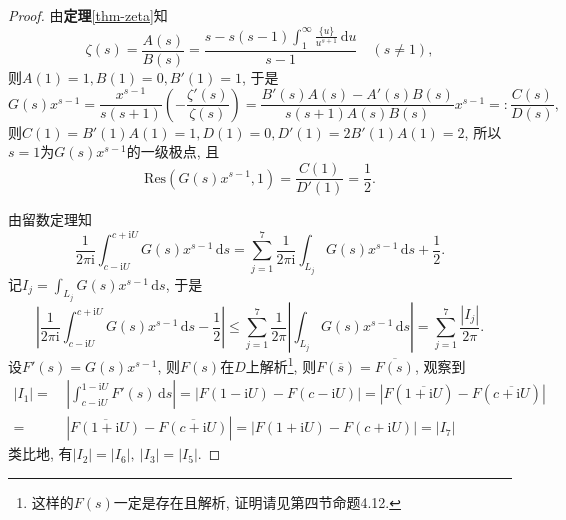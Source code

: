 \documentclass[12pt, a4paper, oneside]{ctexart}
\numberwithin{equation}{section}  %
\let\leq=\leqslant %
\def\disp{\displaystyle}    %
\def\d{\mathrm{d}}          %
\def\i{\mathrm{i}}          %
\def\res{\mathrm{Res}}      %
\def\ol{\overline}          %
\begin{document}
\begin{proof}
    由\textbf{定理}\ref{thm-zeta}知
    \begin{equation*}
        \zeta(s) = \frac{A(s)}{B(s)} = \frac{\disp s-s(s-1)\int_1^{\infty}\frac{\{u\}}{u^{s+1}}\,\d u}{s-1}\quad(s\neq 1),
    \end{equation*}
    则$A(1) = 1, B(1) = 0, B'(1) = 1$, 于是
    \begin{equation*}
        G(s)x^{s-1} = \frac{x^{s-1}}{s(s+1)}\left(-\frac{\zeta'(s)}{\zeta(s)}\right) = \frac{B'(s)A(s)-A'(s)B(s)}{s(s+1)A(s)B(s)}x^{s-1} =: \frac{C(s)}{D(s)},
    \end{equation*}
    则$C(1)=B'(1)A(1) = 1,D(1) = 0, D'(1) = 2B'(1)A(1) = 2$, 所以$s=1$为$G(s)x^{s-1}$的一级极点, 且
    \begin{equation*}
        \res(G(s)x^{s-1},1)=\frac{C(1)}{D'(1)}=\frac{1}{2}.
    \end{equation*}

    由留数定理知
    \begin{equation*}
        \frac{1}{2\pi\i}\int_{c-\i U}^{c+\i U}G(s)x^{s-1}\,\d s=\sum_{j=1}^7\frac{1}{2\pi\i}\int_{L_j}G(s)x^{s-1}\,\d s +\frac{1}{2}.
    \end{equation*}
    记$I_j = \int_{L_j}G(s)x^{s-1}\,\d s$, 于是
    \begin{equation}\label{eq-end}
        \left|\frac{1}{2\pi\i}\int_{c-\i U}^{c+\i U}G(s)x^{s-1}\,\d s-\frac{1}{2}\right|\leq\sum_{j=1}^7\frac{1}{2\pi}\left|\int_{L_j}G(s)x^{s-1}\,\d s\right| = \sum_{j=1}^7\frac{|I_j|}{2\pi}.
    \end{equation}
    设$F'(s) = G(s)x^{s-1}$, 则$F(s)$在$D$上解析\footnote{这样的$F(s)$一定是存在且解析, 证明请见\cite{ref-complex}第四节命题4.12.}, 则$F(\ol{s}) = \ol{F(s)}$, 观察到
    \begin{equation*}
        \begin{aligned}
            |I_1| =&\ \left|\int_{c-\i U}^{1-\i U}F'(s)\,\d s\right| = |F(1-\i U) - F(c-\i U)| = |F(\ol{1+\i U})-F(\ol{c+\i U})|\\
            =&\ |\ol{F(1+\i U)}-\ol{F(c+\i U)}| = |F(1+\i U)-F(c+\i U)| = |I_7|
        \end{aligned}
    \end{equation*}
    类比地, 有$|I_2| = |I_6|,\ |I_3| = |I_5|$.


\end{proof}
\end{document}
